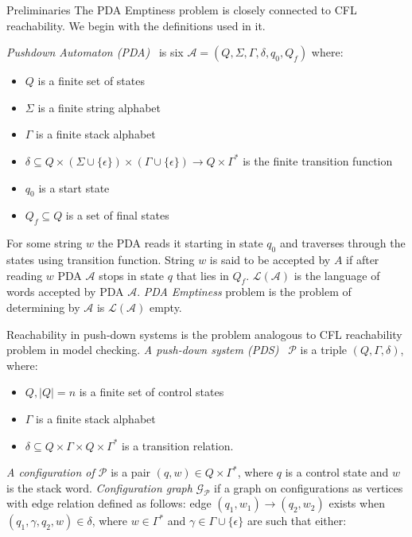 \documentclass[12pt]{article}
\begin{document}
\begin{section}{Preliminaries}
	The PDA Emptiness problem is closely connected to CFL reachability. We begin with the definitions used in it.
	
	\textit{Pushdown Automaton (PDA)}~\cite{schepper2018complexity} is six $\mathcal{A} = (Q, \Sigma, \Gamma, \delta, q_0,Q_f)$ where:

    \begin{itemize}
        \item $Q$ is a finite set of states
        \item $\Sigma$ is a finite string alphabet
        \item $\Gamma$ is a finite stack alphabet
        \item $\delta \subseteq Q \times (\Sigma \cup \{ \epsilon \}) \times (\Gamma \cup \{ \epsilon \}) \rightarrow Q \times \Gamma^*$ is the finite transition function 
        \item $q_0$ is a start state
        \item $Q_f \subseteq Q$ is a set of final states
    \end{itemize}

    For some string $w$ the PDA reads it starting in state $q_0$ and traverses through the states using transition function. String $w$ is said to be accepted by $A$ if after reading $w$ PDA $\mathcal{A}$ stops in state $q$ that lies in $Q_f$. $\mathcal{L}(\mathcal{A})$ is the language of words accepted by PDA $\mathcal{A}$. \emph{PDA Emptiness} problem is the problem of determining by $\mathcal{A}$ is $\mathcal{L}(\mathcal{A})$ empty.

    Reachability in push-down systems is the problem analogous to CFL reachability problem in model checking. \textit{A push-down system (PDS)~\cite{hansen2021tight}} $\mathcal{P}$ is a triple $(Q, \Gamma, \delta)$, where:

 \begin{itemize}
     \item $Q, |Q| = n$ is a finite set of control states
     \item $\Gamma$ is a finite stack alphabet
     \item $\delta \subseteq Q \times \Gamma \times Q \times \Gamma^*$ is a transition relation.
 \end{itemize}   
 
 \textit{A configuration of $\mathcal{P}$} is a pair $(q, w) \in Q \times \Gamma^*$, where $q$ is a control state and $w$ is the stack word. \textit{Configuration graph} $\mathcal{G}_{\mathcal{P}}$ if a graph on configurations as vertices with edge relation defined as follows: edge $(q_1, w_1) \rightarrow (q_2, w_2)$ exists when $(q_1,\gamma,q_2,w) \in \delta$, where $w \in \Gamma^*$ and $\gamma \in \Gamma \cup \{ \epsilon \}$ are such that either:


\end{section}
\end{document}
